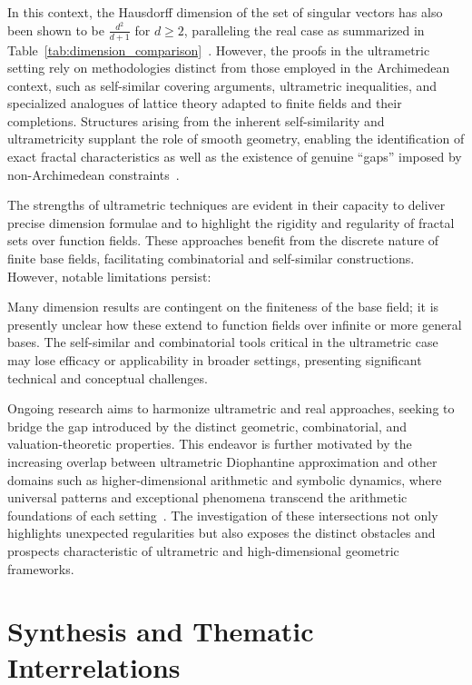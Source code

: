 \documentclass[sigconf]{acmart}
\begin{document}
In this context, the Hausdorff dimension of the set of singular vectors has also been shown to be $\frac{d^2}{d+1}$ for $d \geq 2$, paralleling the real case as summarized in Table~\ref{tab:dimension_comparison}~\cite{ref79}. However, the proofs in the ultrametric setting rely on methodologies distinct from those employed in the Archimedean context, such as self-similar covering arguments, ultrametric inequalities, and specialized analogues of lattice theory adapted to finite fields and their completions. Structures arising from the inherent self-similarity and ultrametricity supplant the role of smooth geometry, enabling the identification of exact fractal characteristics as well as the existence of genuine ``gaps'' imposed by non-Archimedean constraints~\cite{ref79}.

The strengths of ultrametric techniques are evident in their capacity to deliver precise dimension formulae and to highlight the rigidity and regularity of fractal sets over function fields. These approaches benefit from the discrete nature of finite base fields, facilitating combinatorial and self-similar constructions. However, notable limitations persist:

Many dimension results are contingent on the finiteness of the base field; it is presently unclear how these extend to function fields over infinite or more general bases. The self-similar and combinatorial tools critical in the ultrametric case may lose efficacy or applicability in broader settings, presenting significant technical and conceptual challenges.

Ongoing research aims to harmonize ultrametric and real approaches, seeking to bridge the gap introduced by the distinct geometric, combinatorial, and valuation-theoretic properties. This endeavor is further motivated by the increasing overlap between ultrametric Diophantine approximation and other domains such as higher-dimensional arithmetic and symbolic dynamics, where universal patterns and exceptional phenomena transcend the arithmetic foundations of each setting~\cite{ref79,ref109}. The investigation of these intersections not only highlights unexpected regularities but also exposes the distinct obstacles and prospects characteristic of ultrametric and high-dimensional geometric frameworks.

\section{Synthesis and Thematic Interrelations}
\end{document}
